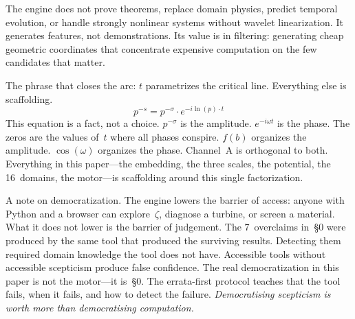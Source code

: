 \documentclass[11pt]{amsart}
\begin{document}
The engine does not prove theorems, replace domain physics, predict temporal
evolution, or handle strongly nonlinear systems without wavelet
linearization. It generates features, not demonstrations. Its value is in
filtering: generating cheap geometric coordinates that concentrate expensive
computation on the few candidates that matter.

The phrase that closes the arc: $t$ parametrizes the critical line.
Everything else is scaffolding.
\begin{equation*}
  p^{-s} = p^{-\sigma} \cdot e^{-i\ln(p)\cdot t}
\end{equation*}
This equation is a fact, not a choice. $p^{-\sigma}$ is the amplitude.
$e^{-i\omega t}$ is the phase. The zeros are the values of~$t$ where all
phases conspire. $f(b)$ organizes the amplitude. $\cos(\omega)$ organizes
the phase. Channel~A is orthogonal to both. Everything in this paper---the
embedding, the three scales, the potential, the 16~domains, the motor---is
scaffolding around this single factorization.

A note on democratization. The engine lowers the barrier of access: anyone
with Python and a browser can explore~$\zeta$, diagnose a turbine, or screen
a material. What it does not lower is the barrier of judgement. The
7~overclaims in~\S0 were produced by the same tool that produced the
surviving results. Detecting them required domain knowledge the tool does not
have. Accessible tools without accessible scepticism produce false
confidence. The real democratization in this paper is not the motor---it
is~\S0. The errata-first protocol teaches that the tool fails, when it
fails, and how to detect the failure. \emph{Democratising scepticism is
worth more than democratising computation.}
\end{document}
